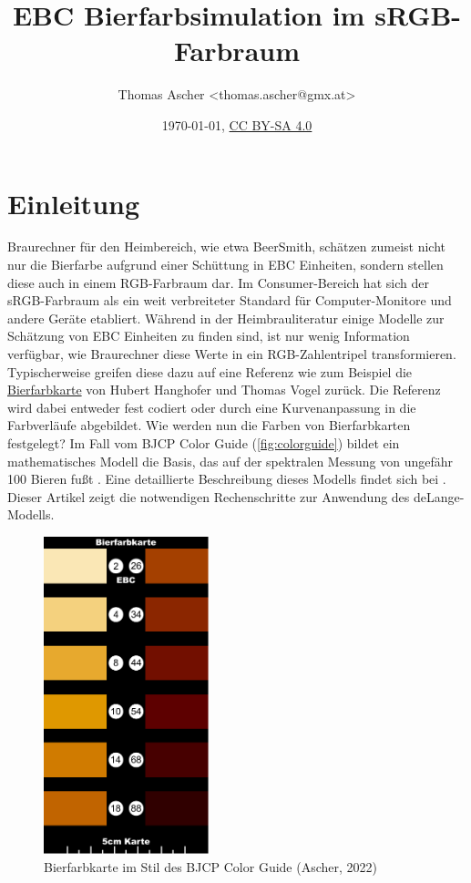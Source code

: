 \documentclass[10pt,a4paper,DIV=12,parskip=half]{scrarticle}
\title{EBC Bierfarbsimulation im sRGB-Farbraum}
\author{Thomas Ascher <thomas.ascher@gmx.at>}
\date{\today, \href{http://creativecommons.org/licenses/by-sa/4.0/}{CC BY-SA 4.0}}
\begin{document}
\maketitle

\section*{Einleitung}

Braurechner für den Heimbereich, wie etwa BeerSmith, schätzen zumeist nicht nur die Bierfarbe aufgrund einer Schüttung in EBC Einheiten, sondern stellen diese auch in einem RGB-Farbraum dar. Im Consumer-Bereich hat sich der sRGB-Farbraum als ein weit verbreiteter Standard für Computer-Monitore und andere Geräte etabliert. Während in der Heimbrauliteratur einige Modelle zur Schätzung von EBC Einheiten zu finden sind, ist nur wenig Information verfügbar, wie Braurechner diese Werte in ein RGB-Zahlentripel transformieren. Typischerweise greifen diese dazu auf eine Referenz wie zum Beispiel die \href{https://www.bierfarbkarte.de}{Bierfarbkarte} von Hubert Hanghofer und Thomas Vogel zurück. Die Referenz wird dabei entweder fest codiert oder durch eine Kurvenanpassung in die Farbverläufe abgebildet. Wie werden nun die Farben von Bierfarbkarten festgelegt? Im Fall vom BJCP Color Guide (\autoref{fig:colorguide}) bildet ein mathematisches Modell die Basis, das auf der spektralen Messung von ungefähr 100 Bieren fußt \parencite{BJCP}. Eine detaillierte Beschreibung dieses Modells findet sich bei \cite{deLange2016}. Dieser Artikel zeigt die notwendigen Rechenschritte zur Anwendung des deLange-Modells.

\begin{figure}[H]
	\centering
	\includegraphics[width=4.8cm]{color_guide.pdf}
	\caption{Bierfarbkarte im Stil des BJCP Color Guide (Ascher, 2022)}
	\label{fig:colorguide}
\end{figure}
\end{document}
